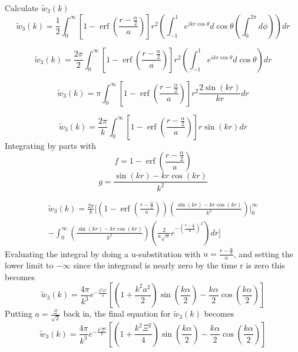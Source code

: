 \documentclass[double,12pt]{beavtex}
\begin{document}
\noindent Calculate $\widetilde{w}_3(k)$ 
\begin{equation}{\widetilde{w}_3(k)=\frac{1}{2}\int_{0}^{\infty}\left[1-\operatorname{erf}\left(\frac{r-\frac{\alpha}{2}}{a}\right)\right]r^2\left(\int_{-1}^{1}e^{ikr\cos\theta}d{\cos\theta}\left(\int_{0}^{2\pi}d{\phi}\right)\right)d{r}}\end{equation}

\begin{equation}{\widetilde{w}_3(k)=\frac{2\pi}{2}\int_{0}^{\infty}\left[1-\operatorname{erf}\left(\frac{r-\frac{\alpha}{2}}{a}\right)\right]r^2\left(\int_{-1}^{1}e^{ikr\cos\theta}d{\cos\theta}\right)d{r}}\end{equation}

\begin{equation}{\widetilde{w}_3(k)=\pi\int_{0}^{\infty}\left[1-\operatorname{erf}\left(\frac{r-\frac{\alpha}{2}}{a}\right)\right]r^2\frac{2\sin(kr)}{kr}d{r}}\end{equation}

\begin{equation}{\widetilde{w}_3(k)=\frac{2\pi}{k}\int_{0}^{\infty}\left[1-\operatorname{erf}\left(\frac{r-\frac{\alpha}{2}}{a}\right)\right]r\sin(kr)d{r}}\end{equation}
Integrating by parts with 
\begin{displaymath}{f=1-\operatorname{erf}\left(\frac{r-\frac{\alpha}{2}}{a}\right)}\end{displaymath}
\begin{displaymath}{g=\frac{\sin(kr)-kr\cos(kr)}{k^2}}\end{displaymath}

\begin{multline}
  \widetilde{w}_3(k)=\frac{2\pi}{k}\Bigg[\left(1-\operatorname{erf}\left(\frac{r-\frac{\alpha}{2}}{a}\right)\right)\left(\frac{\sin(kr)-kr\cos(kr)}{k^2}\right)\bigg|^{\infty}_0
   \\
  -\int_{0}^{\infty}\left(\frac{\sin(kr)-kr\cos(kr)}{k^2}\right)\left(\frac{2}{a\sqrt{\pi}}e^{-\left(\frac{r-\frac{\alpha}{2}}{a}\right)^2}\right)dr\Bigg]
\end{multline}
Evaluating the integral by doing a u-substitution with $u=\frac{r-\frac{\alpha}{2}}{a}$, 
and setting the lower limit to $-\infty$  since the integrand is 
nearly zero by the time r is zero this becomes
\begin{equation}{\widetilde{w}_3(k)=\frac{4\pi}{k^3}e^{-\frac{k^2a^2}{4}}\left[\left(1+\frac{k^2a^2}{2}\right)\sin\left(\frac{k\alpha}{2}\right)-\frac{k\alpha}{2}\cos\left(\frac{k\alpha}{2}\right)\right]}\end{equation}
Putting $a=\frac{\Xi}{\sqrt{2}}$ back in, the final equation for 
$\widetilde{w}_3(k)$ becomes
\begin{equation}{\widetilde{w}_3(k)=\frac{4\pi}{k^3}e^{-\frac{k^2\Xi^2}{8}}\left[\left(1+\frac{k^2\Xi^2}{4}\right)\sin\left(\frac{k\alpha}{2}\right)-\frac{k\alpha}{2}\cos\left(\frac{k\alpha}{2}\right)\right]}\end{equation}
\end{document}
